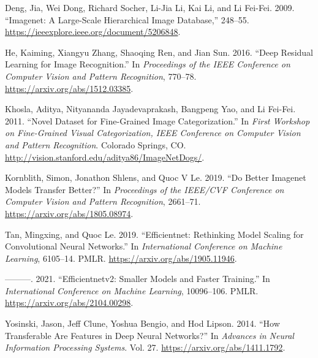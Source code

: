 \documentclass[
  letterpaper,
  DIV=11,
  numbers=noendperiod]{scrartcl}
\newlength{\cslhangindent}
\newenvironment{CSLReferences}[2] %
 {\begin{list}{}{%
  \setlength{\itemindent}{0pt}
  \setlength{\leftmargin}{0pt}
  \setlength{\parsep}{0pt}
  \ifodd #1
   \setlength{\leftmargin}{\cslhangindent}
   \setlength{\itemindent}{-1\cslhangindent}
  \fi
  \setlength{\itemsep}{#2\baselineskip}}}
 {\end{list}}
\begin{document}
\label{refs}
\begin{CSLReferences}{1}{0}
Deng, Jia, Wei Dong, Richard Socher, Li-Jia Li, Kai Li, and Li Fei-Fei.
2009. {``Imagenet: A Large-Scale Hierarchical Image Database,''}
248--55. \url{https://ieeexplore.ieee.org/document/5206848}.

He, Kaiming, Xiangyu Zhang, Shaoqing Ren, and Jian Sun. 2016. {``Deep
Residual Learning for Image Recognition.''} In \emph{Proceedings of the
IEEE Conference on Computer Vision and Pattern Recognition}, 770--78.
\url{https://arxiv.org/abs/1512.03385}.

Khosla, Aditya, Nityananda Jayadevaprakash, Bangpeng Yao, and Li
Fei-Fei. 2011. {``Novel Dataset for Fine-Grained Image
Categorization.''} In \emph{First Workshop on Fine-Grained Visual
Categorization, IEEE Conference on Computer Vision and Pattern
Recognition}. Colorado Springs, CO.
\url{http://vision.stanford.edu/aditya86/ImageNetDogs/}.

Kornblith, Simon, Jonathon Shlens, and Quoc V Le. 2019. {``Do Better
Imagenet Models Transfer Better?''} In \emph{Proceedings of the IEEE/CVF
Conference on Computer Vision and Pattern Recognition}, 2661--71.
\url{https://arxiv.org/abs/1805.08974}.

Tan, Mingxing, and Quoc Le. 2019. {``Efficientnet: Rethinking Model
Scaling for Convolutional Neural Networks.''} In \emph{International
Conference on Machine Learning}, 6105--14. PMLR.
\url{https://arxiv.org/abs/1905.11946}.

---------. 2021. {``Efficientnetv2: Smaller Models and Faster
Training.''} In \emph{International Conference on Machine Learning},
10096--106. PMLR. \url{https://arxiv.org/abs/2104.00298}.

Yosinski, Jason, Jeff Clune, Yoshua Bengio, and Hod Lipson. 2014. {``How
Transferable Are Features in Deep Neural Networks?''} In \emph{Advances
in Neural Information Processing Systems}. Vol. 27.
\url{https://arxiv.org/abs/1411.1792}.

\end{CSLReferences}
\end{document}
